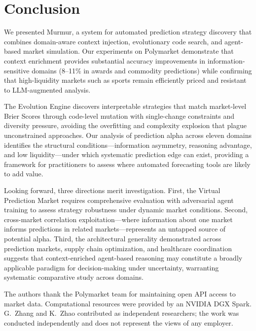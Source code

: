 \section{Conclusion}
\label{sec:conclusion}

We presented Murmur, a system for automated prediction strategy discovery that combines domain-aware context injection, evolutionary code search, and agent-based market simulation. Our experiments on Polymarket demonstrate that context enrichment provides substantial accuracy improvements in information-sensitive domains (8--11\% in awards and commodity predictions) while confirming that high-liquidity markets such as sports remain efficiently priced and resistant to LLM-augmented analysis.

The Evolution Engine discovers interpretable strategies that match market-level Brier Scores through code-level mutation with single-change constraints and diversity pressure, avoiding the overfitting and complexity explosion that plague unconstrained approaches. Our analysis of prediction alpha across eleven domains identifies the structural conditions---information asymmetry, reasoning advantage, and low liquidity---under which systematic prediction edge can exist, providing a framework for practitioners to assess where automated forecasting tools are likely to add value.

Looking forward, three directions merit investigation. First, the Virtual Prediction Market requires comprehensive evaluation with adversarial agent training to assess strategy robustness under dynamic market conditions. Second, cross-market correlation exploitation---where information about one market informs predictions in related markets---represents an untapped source of potential alpha. Third, the architectural generality demonstrated across prediction markets, supply chain optimization, and healthcare coordination suggests that context-enriched agent-based reasoning may constitute a broadly applicable paradigm for decision-making under uncertainty, warranting systematic comparative study across domains.

\begin{acks}
The authors thank the Polymarket team for maintaining open API access to market data. Computational resources were provided by an NVIDIA DGX Spark. G.~Zhang and K.~Zhao contributed as independent researchers; the work was conducted independently and does not represent the views of any employer.
\end{acks}
